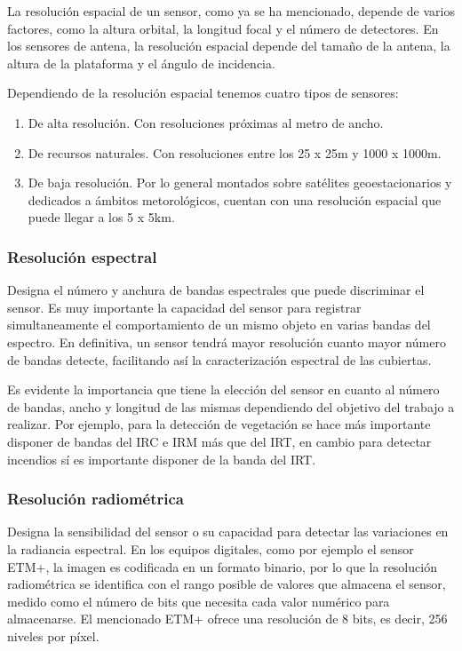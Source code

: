 La resolución espacial de un sensor, como ya se ha mencionado, depende de varios factores, como la altura orbital, la longitud focal y el número de detectores. En los sensores de antena, la resolución espacial depende del tamaño de la antena, la altura de la plataforma y el ángulo de incidencia.\Sep

Dependiendo de la resolución espacial tenemos cuatro tipos de sensores:
\begin{enumerate}
	\item De alta resolución. Con resoluciones próximas al metro de ancho.
	\item De recursos naturales. Con resoluciones entre los 25 x 25m y 1000 x 1000m.
	\item De baja resolución. Por lo general montados sobre satélites geoestacionarios y dedicados a ámbitos metorológicos, cuentan con una resolución espacial que puede llegar a los 5 x 5km.
\end{enumerate}

\subsubsection{Resolución espectral}
Designa el número y anchura de bandas espectrales que puede discriminar el sensor. Es muy importante la capacidad del sensor para registrar simultaneamente el comportamiento de un mismo objeto en varias bandas del espectro. En definitiva, un sensor tendrá mayor resolución cuanto mayor número de bandas detecte, facilitando así la caracterización espectral de las cubiertas.\Sep

Es evidente la importancia que tiene la elección del sensor en cuanto al número de bandas, ancho y longitud de las mismas dependiendo del objetivo del trabajo a realizar. Por ejemplo, para la detección de vegetación se hace más importante disponer de bandas del \ac{IRC} e \ac{IRM} más que del \ac{IRT}, en cambio para detectar incendios sí es importante disponer de la banda del \ac{IRT}.

\subsubsection{Resolución radiométrica}
Designa la sensibilidad del sensor o su capacidad para detectar las variaciones en la radiancia espectral. En los equipos digitales, como por ejemplo el sensor \ac{ETM+}, la imagen es codificada en un formato binario, por lo que la resolución radiométrica se identifica con el rango posible de valores que almacena el sensor, medido como el número de bits que necesita cada valor numérico para almacenarse. El mencionado \ac{ETM+} ofrece una resolución de 8 bits, es decir, 256 niveles por píxel.\Sep

